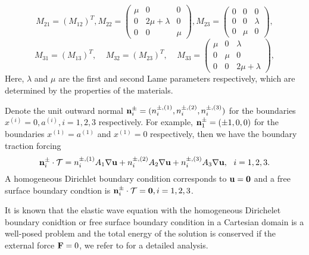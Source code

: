\[ M_{21} =(M_{12})^T, M_{22} = \left(\begin{array}{ccc}
\mu & 0 & 0\\
0 & 2\mu+\lambda & 0\\
0 & 0 & \mu\end{array}\right), M_{23} = \left(\begin{array}{ccc}
0 & 0 & 0\\
0 & 0 & \lambda\\
0 & \mu & 0\end{array}\right),\]
\[ M_{31} = (M_{13})^T, \ \ \ \ \ M_{32} =(M_{23})^T, \ \ \ \ \ M_{33} = \left(\begin{array}{ccc}
\mu & 0 & \lambda\\
0 & \mu & 0\\
0 & 0 & 2\mu+\lambda\end{array}\right),\]
Here, $\lambda$ and $\mu$ are the first and second Lame parameters respectively, which are determined by the properties of the materials.

Denote the unit outward normal ${\bf n}_i^{\pm} = (n_i^{\pm,(1)},n_i^{\pm,(2)},n_i^{\pm,(3)})$ for the boundaries $x^{(i)} = 0, a^{(i)}, i = 1,2,3$ respectively. For example, ${\bf n}_1^{\pm} = (\pm 1, 0,0)$ for the boundaries $x^{(1)} = a^{(1)}$ and $x^{(1)} = 0$ respectively, then we have the boundary traction forcing 
\begin{equation*}
{\bf n}_i^{\pm}\cdot\mathcal{T} = n^{\pm,(1)}_iA_1\nabla{\bf u} + n^{\pm,(2)}_iA_2\nabla{\bf u} + n^{\pm,(3)}_iA_3\nabla{\bf u},\ \ i = 1,2,3.
\end{equation*}
A homogeneous Dirichlet boundary condition corresponds to ${\bf u} = {\bf 0}$ and a free surface boundary condtion is ${\bf n}_i^{\pm}\cdot\mathcal{T}  = {\bf 0}, i = 1,2,3$.

It is known that the elastic wave equation with the homogeneous Dirichelet boundary conidtion or free surface boundary condition in a Cartesian domain is a well-posed problem and the total energy of the solution is conserved if the external force ${\bf F} = 0$, we refer to \cite{petersson2015wave} for a detailed analysis.

